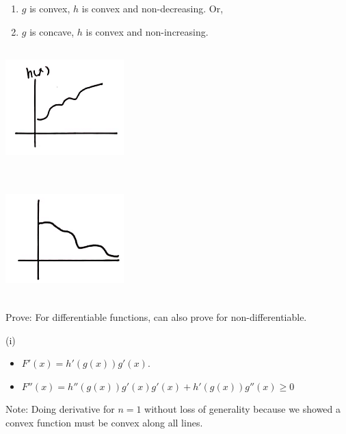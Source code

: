\begin{enumerate}
	\item $g$ is convex, $h$ is convex and non-decreasing. Or,
	
	\item $g$ is concave, $h$ is convex and non-increasing.
\end{enumerate}

\begin{marginfigure}
	\centering
	\includegraphics[width=1.8in,height=1.8in]{figures/ch08/figure1111_4.png}
\end{marginfigure}

\begin{marginfigure}
	\centering
	\includegraphics[width=1.8in,height=1.8in]{figures/ch08/figure1111_5.png}
\end{marginfigure}

Prove: For differentiable functions, can also prove for non-differentiable. 

(i)

\begin{itemize}
	\item $F'(x) = h'(g(x))g'(x)$.
	
	\item $F''(x) = h''(g(x))g'(x)g'(x) + h'(g(x))g''(x) \geq 0$ 
\end{itemize}



Note: Doing derivative for $n=1$ without loss of generality because we showed a convex function must be convex along all lines. 



